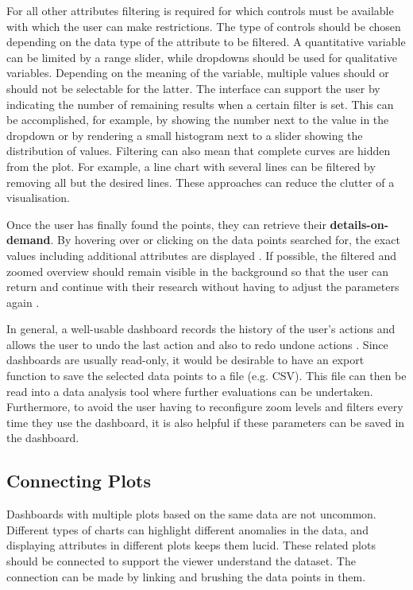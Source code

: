 \documentclass[11pt]{article}
\begin{document}
For all other attributes filtering is required for which controls must be available with which the user can make restrictions. The type of controls should be chosen depending on the data type of the attribute to be filtered. A quantitative variable can be limited by a range slider, while dropdowns should be used for qualitative variables. Depending on the meaning of the variable, multiple values should or should not be selectable for the latter. The interface can support the user by indicating the number of remaining results when a certain filter is set. This can be accomplished, for example, by showing the number next to the value in the dropdown or by rendering a small histogram next to a slider showing the distribution of values. Filtering can also mean that complete curves are hidden from the plot. For example, a line chart with several lines can be filtered by removing all but the desired lines. These approaches can reduce the clutter of a visualisation.

Once the user has finally found the points, they can retrieve their \textbf{details-on-demand}. By hovering over or clicking on the data points searched for, the exact values including additional attributes are displayed \parencite{shneiderman_thousand-fold_1997}. If possible, the filtered and zoomed overview should remain visible in the background so that the user can return and continue with their research without having to adjust the parameters again \parencite{shneiderman_eyes_1996}.

In general, a well-usable dashboard records the history of the user's actions and allows the user to undo the last action and also to redo undone actions \parencite{shneiderman_eyes_1996}. Since dashboards are usually read-only, it would be desirable to have an export function to save the selected data points to a file (e.g. CSV). This file can then be read into a data analysis tool where further evaluations can be undertaken. Furthermore, to avoid the user having to reconfigure zoom levels and filters every time they use the dashboard, it is also helpful if these parameters can be saved in the dashboard.

\subsection{Connecting Plots}

Dashboards with multiple plots based on the same data are not uncommon. Different types of charts can highlight different anomalies in the data, and displaying attributes in different plots keeps them lucid. These related plots should be connected to support the viewer understand the dataset. The connection can be made by linking and brushing the data points in them.
\end{document}
